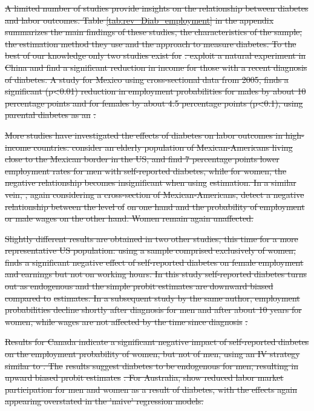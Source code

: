 \documentclass[12pt,english]{article}
\providecommand{\DIFdeltex}[1]{{\protect\color{red}\sout{#1}}}                      %
\providecommand{\DIFdel}[1]{\texorpdfstring{\DIFdeltex{#1}}{}} %
\begin{document}
\DIFdel{A limited number of studies provide insights on the relationship between diabetes and labor outcomes.  Table \ref{tab:rev_Diab_employment} in the appendix summarizes the main findings of these studies, the characteristics of the sample, the estimation method they use and the approach to measure diabetes.  To the best of our knowledge only two studies exist for }%
\DIFdel{. \textcite{Liu2014} exploit a natural experiment in China and find a significant reduction in income for those with a recent diagnosis of diabetes. A study for Mexico using cross-sectional data from 2005, finds a significant (p<0.01) reduction in employment probabilities for males by about 10 percentage points and for females by about 4.5 percentage points (p<0.1), using parental diabetes as an }%
\DIFdel{.
}%

\DIFdel{More studies have investigated the effects of diabetes on labor outcomes in high-income countries. \textcite{Brown2005} consider an elderly population of Mexican-Americans living close to the Mexican border in the US, and find 7 percentage points lower employment rates for men with self-reported diabetes, while for women, the negative relationship becomes insignificant when using }%
\DIFdel{estimation.  In a similar vein, \textcite{BrownIII2011}, again considering a cross-section of Mexican-Americans, detect a negative  relationship between the level of }%
\DIFdel{on one hand and the probability of employment or male wages on the other hand. Women remain again unaffected.  
}%

\DIFdel{Slightly different results are obtained in two other studies, this time for a more representative US population: using a sample comprised exclusively of women, \textcite{Minor2011} finds a significant negative effect of self-reported diabetes on female employment and earnings but not on working hours. In this study self-reported diabetes turns out as endogenous and the simple probit estimates are downward biased compared to }%
\DIFdel{estimates. In a subsequent study by the same author, employment probabilities decline shortly after diagnosis for men and after about 10 years for women, while wages are not affected by the time since diagnosis }%
\DIFdel{.
}%

\DIFdel{Results for Canada indicate a significant negative impact of self-reported diabetes on the employment probability of women, but not of men, using an IV strategy similar to \textcite{Brown2005}. The }%
\DIFdel{results suggest diabetes to be  endogenous for men, resulting in upward biased probit estimates }%
\DIFdel{. For Australia, \textcite{Zhang2009} show  reduced labor market participation for men and women as a result of diabetes, with the effects again appearing overstated in the 'naive' regression models.
}%
\end{document}
